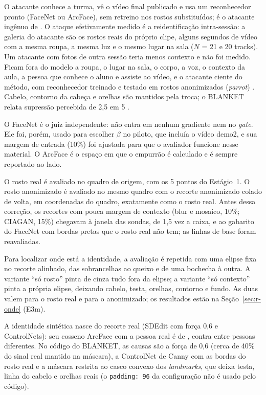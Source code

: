O atacante conhece a turma, vê o vídeo final publicado e usa um reconhecedor pronto (FaceNet ou ArcFace), sem retreino nos rostos substituídos; é o atacante ingênuo de \citet{hanisch}. O ataque efetivamente medido é a reidentificação intra-sessão: a galeria do atacante são os rostos reais do próprio clipe, alguns segundos de vídeo com a mesma roupa, a mesma luz e o mesmo lugar na sala ($N$ = 21 e 20 tracks). Um atacante com fotos de outra sessão teria menos contexto e não foi medido. Ficam fora do modelo a roupa, o lugar na sala, o corpo, a voz, o contexto da aula, a pessoa que conhece o aluno e assiste ao vídeo, e o atacante ciente do método, com reconhecedor treinado e testado em rostos anonimizados (\emph{parrot}) \citep{hanisch}. Cabelo, contorno da cabeça e orelhas são mantidos pela troca; o BLANKET relata supressão percebida de 2,5 em 5 \citep{blanket}.

O FaceNet é o juiz independente: não entra em nenhum gradiente nem no \emph{gate}. Ele foi, porém, usado para escolher $\beta$ no piloto, que incluía o vídeo demo2, e sua margem de entrada (10\%) foi ajustada para que o avaliador funcione nesse material. O ArcFace é o espaço em que o empurrão é calculado e é sempre reportado ao lado.

O rosto real é avaliado no quadro de origem, com os 5 pontos do Estágio~1. O rosto anonimizado é avaliado no mesmo quadro com o recorte anonimizado colado de volta, em coordenadas do quadro, exatamente como o rosto real. Antes dessa correção, os recortes com pouca margem de contexto (blur e mosaico, 10\%; CIAGAN, 15\%) chegavam à janela das sondas, de 1,5 vez a caixa, e ao gabarito do FaceNet com bordas pretas que o rosto real não tem; as linhas de base foram reavaliadas.

Para localizar onde está a identidade, a avaliação é repetida com uma elipse fixa no recorte alinhado, das sobrancelhas ao queixo e de uma bochecha à outra. A variante ``só rosto'' pinta de cinza tudo fora da elipse; a variante ``só contexto'' pinta a própria elipse, deixando cabelo, testa, orelhas, contorno e fundo. As duas valem para o rosto real e para o anonimizado; os resultados estão na Seção~\ref{sec:r-onde} (E3m).

A identidade sintética nasce do recorte real (SDEdit com força 0,6 e ControlNets): seu cosseno ArcFace com a pessoa real é de , contra  entre pessoas diferentes. No código do BLANKET, as causas são a força de 0,6 (cerca de 40\% do sinal real mantido na máscara), a ControlNet de Canny com as bordas do rosto real e a máscara restrita ao casco convexo dos \emph{landmarks}, que deixa testa, linha do cabelo e orelhas reais (o \texttt{padding: 96} da configuração não é usado pelo código).

